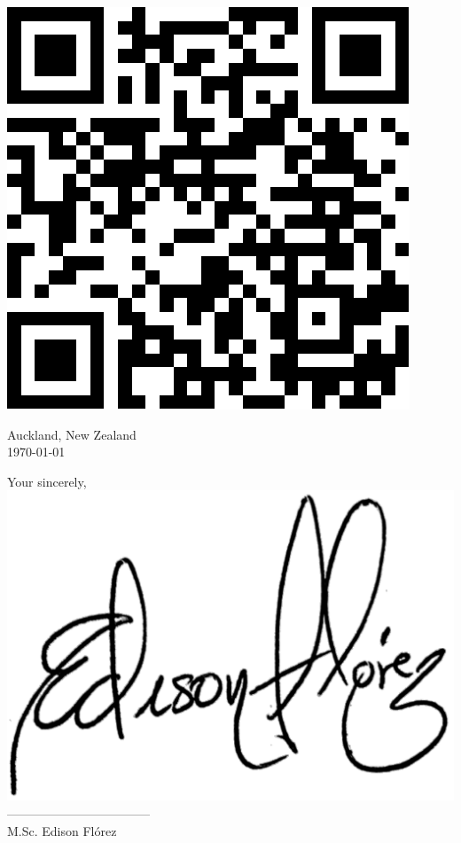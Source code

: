 \begin{flushright}

    \href{https://sites.google.com/view/edisonflorez/home}{\includegraphics[scale=0.15]{figs/qr_google_sites.pdf}}
\end{flushright}

\vspace*{5mm}
Auckland, New Zealand\\
\today

\vfill

\begin{flushright}
    Your sincerely,\\ \vspace*{4mm}
    \includegraphics[scale=0.23]{figs/firma.pdf}\\ \vspace*{-10mm}
    -----------------------------------\\
    M.Sc. Edison Flórez %

\end{flushright}